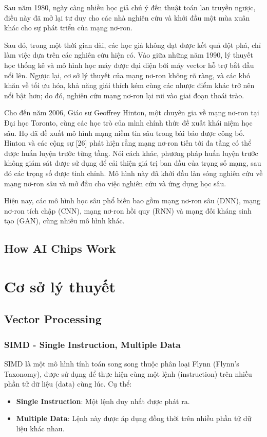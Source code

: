 \documentclass[a4paper]{article}
\begin{document}
Sau năm 1980, ngày càng nhiều học giả chú ý đến thuật toán lan truyền ngược, điều này đã mở lại tư duy cho các nhà nghiên cứu và khởi đầu một mùa xuân khác cho sự phát triển của mạng nơ-ron.

Sau đó, trong một thời gian dài, các học giả không đạt được kết quả đột phá, chỉ làm việc dựa trên các nghiên cứu hiện có. Vào giữa những năm 1990, lý thuyết học thống kê và mô hình học máy được đại diện bởi máy vector hỗ trợ bắt đầu nổi lên. Ngược lại, cơ sở lý thuyết của mạng nơ-ron không rõ ràng, và các khó khăn về tối ưu hóa, khả năng giải thích kém cùng các nhược điểm khác trở nên nổi bật hơn; do đó, nghiên cứu mạng nơ-ron lại rơi vào giai đoạn thoái trào.

Cho đến năm 2006, Giáo sư Geoffrey Hinton, một chuyên gia về mạng nơ-ron tại Đại học Toronto, cùng các học trò của mình chính thức đề xuất khái niệm học sâu. Họ đã đề xuất mô hình mạng niềm tin sâu trong bài báo được công bố. Hinton và các cộng sự [26] phát hiện rằng mạng nơ-ron tiến tới đa tầng có thể được huấn luyện trước từng tầng. Nói cách khác, phương pháp huấn luyện trước không giám sát được sử dụng để cải thiện giá trị ban đầu của trọng số mạng, sau đó các trọng số được tinh chỉnh. Mô hình này đã khởi đầu làn sóng nghiên cứu về mạng nơ-ron sâu và mở đầu cho việc nghiên cứu và ứng dụng học sâu.

Hiện nay, các mô hình học sâu phổ biến bao gồm mạng nơ-ron sâu (DNN), mạng nơ-ron tích chập (CNN), mạng nơ-ron hồi quy (RNN) và mạng đối kháng sinh tạo (GAN), cùng nhiều mô hình khác.
\subsection{How AI Chips Work}

\section{Cơ sở lý thuyết}
\subsection{Vector Processing}
\subsubsection{SIMD - Single Instruction, Multiple Data}
SIMD là một mô hình tính toán song song thuộc phân loại Flynn (Flynn's Taxonomy), được sử dụng để thực hiện cùng một lệnh (instruction) trên nhiều phần tử dữ liệu (data) cùng lúc. Cụ thể:
\begin{itemize}
\item \textbf{Single Instruction}: Một lệnh duy nhất được phát ra.
\item \textbf{Multiple Data}: Lệnh này được áp dụng đồng thời trên nhiều phần tử dữ liệu khác nhau.
\end{itemize}
 
\end{document}
